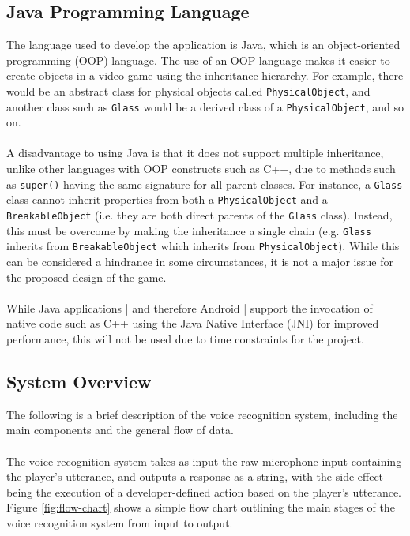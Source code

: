 \documentclass[11pt]{article}
\begin{document}
\subsection{Java Programming Language}

The language used to develop the application is Java, which is an object-oriented programming (OOP) language. The use of an OOP language makes it easier to create objects in a video game using the inheritance hierarchy. For example, there would be an abstract class for physical objects called \texttt{PhysicalObject}, and another class such as \texttt{Glass} would be a derived class of a \texttt{PhysicalObject}, and so on.
\\
\\
A disadvantage to using Java is that it does not support multiple inheritance, unlike other languages with OOP constructs such as C++, due to methods such as \texttt{super()} having the same signature for all parent classes. For instance, a \texttt{Glass} class cannot inherit properties from both a \texttt{PhysicalObject} and a \texttt{BreakableObject} (i.e. they are both direct parents of the \texttt{Glass} class). Instead, this must be overcome by making the inheritance a single chain (e.g. \texttt{Glass} inherits from \texttt{BreakableObject} which inherits from \texttt{PhysicalObject}). While this can be considered a hindrance in some circumstances, it is not a major issue for the proposed design of the game.
\\
\\
While Java applications | and therefore Android | support the invocation of native code such as C++ using the Java Native Interface (JNI) for improved performance, this will not be used due to time constraints for the project.

\subsection{System Overview}

The following is a brief description of the voice recognition system, including the main components and the general flow of data.
\\
\\
The voice recognition system takes as input the raw microphone input containing the player's utterance, and outputs a response as a string, with the side-effect being the execution of a developer-defined action based on the player's utterance. Figure \ref{fig:flow-chart} shows a simple flow chart outlining the main stages of the voice recognition system from input to output.
\end{document}
